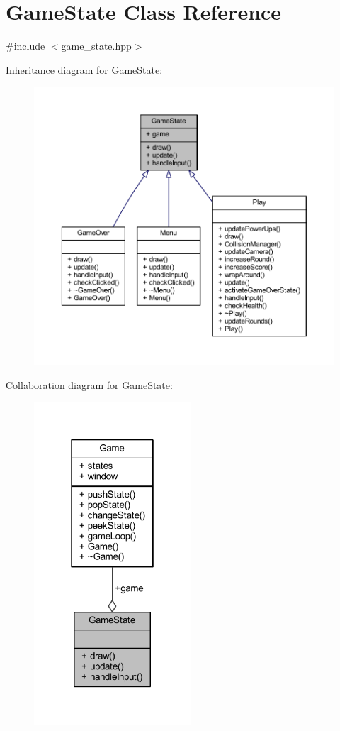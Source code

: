 \hypertarget{class_game_state}{}\section{Game\+State Class Reference}
\label{class_game_state}


{\ttfamily \#include $<$game\+\_\+state.\+hpp$>$}



Inheritance diagram for Game\+State\+:
\nopagebreak
\begin{figure}[H]
\begin{center}
\leavevmode
\includegraphics[width=350pt]{class_game_state__inherit__graph}
\end{center}
\end{figure}


Collaboration diagram for Game\+State\+:
\nopagebreak
\begin{figure}[H]
\begin{center}
\leavevmode
\includegraphics[width=166pt]{class_game_state__coll__graph}
\end{center}
\end{figure}
